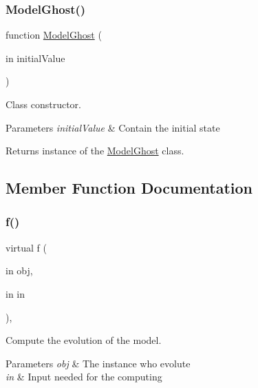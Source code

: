\subsubsection{\texorpdfstring{Model\+Ghost()}{ModelGhost()}}
{\footnotesize\ttfamily function \hyperlink{class_model_ghost}{Model\+Ghost} (\begin{DoxyParamCaption}\item[{in}]{initial\+Value }\end{DoxyParamCaption})}



Class constructor. 


\begin{DoxyParams}{Parameters}
{\em initial\+Value} & Contain the initial state \\
\hline
\end{DoxyParams}
\begin{DoxyReturn}{Returns}
instance of the \hyperlink{class_model_ghost}{Model\+Ghost} class. 
\end{DoxyReturn}


\subsection{Member Function Documentation}
\mbox{\label{class_model_s_e_d_ac36f9451c43b120828af4380858f2024}} 
\subsubsection{\texorpdfstring{f()}{f()}\hspace{0.1cm}{\footnotesize\ttfamily [1/2]}}
{\footnotesize\ttfamily virtual f (\begin{DoxyParamCaption}\item[{in}]{obj,  }\item[{in}]{in }\end{DoxyParamCaption})\hspace{0.3cm}{\ttfamily [virtual]}, {\ttfamily [inherited]}}



Compute the evolution of the model. 


\begin{DoxyParams}{Parameters}
{\em obj} & The instance who evolute \\
\hline
{\em in} & Input needed for the computing \\
\hline
\end{DoxyParams}

